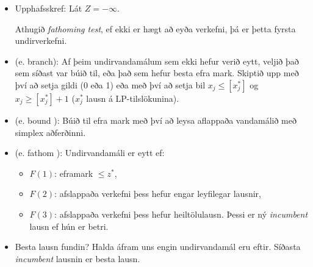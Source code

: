 \begin{itemize}
\item Upphafsskref: Lát $Z=-\infty$. \begin{aths}Athugið \emph{fathoming test}, ef ekki er hægt að eyða verkefni, þá er þetta fyrsta undirverkefni.\end{aths}
\item {} (e. branch): Af þeim undirvandamálum sem ekki hefur verið eytt, veljið það sem síðast var búið til, eða það sem hefur besta efra mark. Skiptið upp með því að setja gildi (0 eða 1) eða með því að setja bil $x_j\le[x_j^*]$ og $x_j\ge [x_j^*]+1$ ($x_j^*$ lausn á LP-tilslökunina).
 
\item {} (e. bound ): Búið til efra mark með því að leysa aflappaða vandamálið með simplex aðferðinni.
\item {} (e. fathom ): Undirvandamáli er eytt ef:
\begin{itemize}
\item $F(1)$: eframark $\le z^*$,
\item $F(2)$: afslappaða verkefni þess hefur engar leyfilegar lausnir,
\item $F(3)$: afslappaða verkefni þess hefur heiltölulausn. Þessi er ný \emph{incumbent} lausn ef hún er betri.
\end{itemize}
\item Besta lausn fundin? Halda áfram uns engin undirvandamál eru eftir.  Síðasta \emph{incumbent} lausnin er besta lausn.
\end{itemize}

